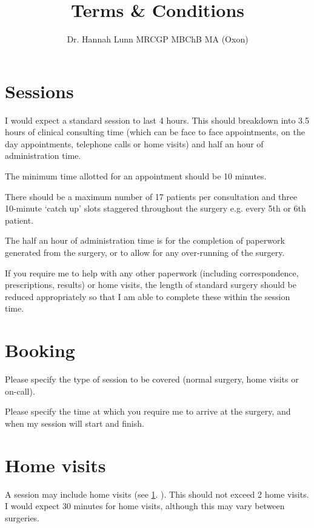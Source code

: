 \documentclass[12pt, a4paper]{article}
\title{Terms \& Conditions\vspace{-2ex}}
\author{Dr. Hannah Lunn MRCGP MBChB MA (Oxon)\vspace{-2ex}}
\begin{document}
\maketitle

\section{Sessions}
\label{sessions}

I would expect a standard session to last 4 hours.
This should breakdown into 3.5 hours of clinical consulting time (which can be face to face appointments, on the day appointments, telephone calls or home visits) and half an hour of administration time.

The minimum time allotted for an appointment should be 10 minutes.

There should be a maximum number of 17 patients per consultation and three 10-minute ‘catch up’ slots staggered throughout the surgery e.g. every 5th or 6th patient.

The half an hour of administration time is for the completion of paperwork generated from the surgery, or to allow for any over-running of the surgery.

If you require me to help with any other paperwork (including correspondence, prescriptions, results) or home visits, the length of standard surgery should be reduced appropriately so that I am able to complete these within the session time.

\section{Booking}

Please specify the type of session to be covered (normal surgery, home visits or on-call).

Please specify the time at which you require me to arrive at the surgery, and when my session will start and finish.

\section{Home visits}

A session may include home visits (see \ref{sessions}. ).
This should not exceed 2 home visits.
I would expect 30 minutes for home visits, although this may vary between surgeries.
\end{document}

